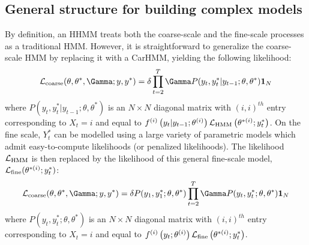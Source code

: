 

\subsection{General structure for building complex models}

By definition, an HHMM treats both the coarse-scale and the fine-scale processes as a traditional HMM. However, it is straightforward to generalize the coarse-scale HMM by replacing it with a CarHMM, yielding the following likelihood:
\[
\calL_{\text{coarse}}(\theta,\theta^*,\Gamma;y,y^*) = \delta \prod_{t=2}^T \Gamma P(y_t,y^*_t|y_{t-1};\theta,\theta^*) \mathbf{1}_N
\]
where $P(y_t,y^*_t|y_{t-1};\theta,\theta^*) $ is an $N \times N$ diagonal matrix with $(i,i)^{th}$ entry corresponding to $X_t=i$ and equal to $f^{(i)}\left(y_t|y_{t-1};\theta^{(i)}\right)\mathcal{L}_{\text{HMM}}\left(\theta^{*(i)};y^*_t\right)$. 
On the fine scale, $Y^*_t$ can be modelled using a large variety of parametric models which admit easy-to-compute likelihoods (or penalized likelihoods). The likelihood $\mathcal{L}_{\text{HMM}}$ is then replaced by the likelihood of this general fine-scale model, $\mathcal{L}_{\text{fine}}(\theta^{*(i)};y^*_t)$:
\[
\calL_{\text{coarse}}(\theta,\theta^*,\Gamma;y,y^*) = \delta P(y_1,y^*_1;\theta,\theta^*) \prod_{t=2}^T \Gamma P(y_t,y^*_t;\theta,\theta^*) \mathbf{1}_N
\]
where $P(y_t,y^*_t;\theta,\theta^*) $ is an $N \times N$ diagonal matrix with $(i,i)^{th}$ entry corresponding to $X_t=i$ and equal to $f^{(i)}\left(y_t;\theta^{(i)}\right)\mathcal{L}_{\text{fine}}\left(\theta^{*(i)};y^*_t\right)$. 

